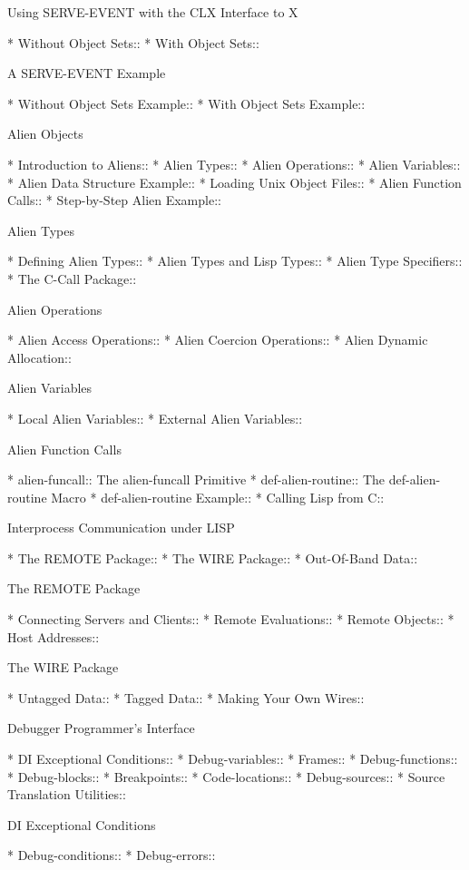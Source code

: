 \begin{menu}
Using SERVE-EVENT with the CLX Interface to X

* Without Object Sets::         
* With Object Sets::            

A SERVE-EVENT Example

* Without Object Sets Example::  
* With Object Sets Example::    

Alien Objects

* Introduction to Aliens::      
* Alien Types::                 
* Alien Operations::            
* Alien Variables::             
* Alien Data Structure Example::  
* Loading Unix Object Files::   
* Alien Function Calls::        
* Step-by-Step Alien Example::  

Alien Types

* Defining Alien Types::        
* Alien Types and Lisp Types::  
* Alien Type Specifiers::       
* The C-Call Package::          

Alien Operations

* Alien Access Operations::     
* Alien Coercion Operations::   
* Alien Dynamic Allocation::    

Alien Variables

* Local Alien Variables::       
* External Alien Variables::    

Alien Function Calls

* alien-funcall::               The alien-funcall Primitive
* def-alien-routine::           The def-alien-routine Macro
* def-alien-routine Example::   
* Calling Lisp from C::         

Interprocess Communication under LISP

* The REMOTE Package::          
* The WIRE Package::            
* Out-Of-Band Data::            

The REMOTE Package

* Connecting Servers and Clients::  
* Remote Evaluations::          
* Remote Objects::              
* Host Addresses::              

The WIRE Package

* Untagged Data::               
* Tagged Data::                 
* Making Your Own Wires::       

Debugger Programmer's Interface

* DI Exceptional Conditions::
* Debug-variables::
* Frames::
* Debug-functions::
* Debug-blocks::
* Breakpoints::
* Code-locations::
* Debug-sources::
* Source Translation Utilities::

DI Exceptional Conditions

* Debug-conditions::
* Debug-errors::
\end{menu}

